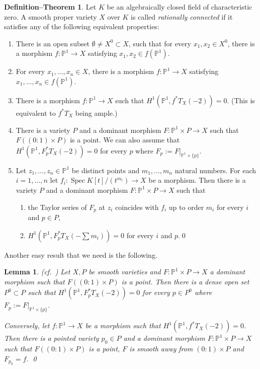 \documentclass[12pt,twoside]{amsart}
\newcommand{\p}[0]{{\mathbb P}}
\newcommand{\spec}[0]{\operatorname{Spec}}
\newtheorem{lem}[thm]{Lemma}
\theoremstyle{definition}
\newtheorem{defn-thm}[thm]{Definition--Theorem}
\theoremstyle{remark}
\begin{document}
\begin{defn-thm}
 \label{rc.equiv.def}
Let $ K$ be an  algebraically closed field of characteristic zero.
 A smooth proper variety $X$ over $ K$
is called {\em rationally connected} if it satisfies any of the
following 
equivalent properties:
\begin{enumerate}
\item There is an open subset $\emptyset\neq X^0\subset X$,
such that for every
$x_1,x_2\in X^0$, there is a morphism $f:\p^1\to X$ satisfying
$x_1,x_2\in f(\p^1)$.

\item For every
$x_1,\dots,x_n\in X$, there is a morphism $f:\p^1\to X$
satisfying
$x_1,\dots,x_n\in f(\p^1)$.

\item There is a morphism $f:\p^1\to X$ such that 
$H^1(\p^1,f^*T_X(-2))=0$. (This is equivalent to $f^*T_X$ being 
ample.) 
 
 
\item There is a variety $P$ and a dominant morphism
$F:\p^1\times P\to X$ such that $F((0{\colon\!}1)\times P)$ is a point.
We can also assume that $H^1(\p^1,F_p^*T_X(-2))=0$ for every $p$ where
$F_p:=F|_{\p^1\times\{p\}}$.


\item  Let $z_1,\dots,z_n\in\p^1$ be distinct points
and $m_1,\dots,m_n$ natural numbers. For
each $i=1,\dots,n$ let
$f_i:\spec  K[t]/(t^{m_i})\to X$ be a morphism.  
 Then there is a variety $P$ and a dominant morphism
$F:\p^1\times P\to X$
 such that 
 \begin{enumerate}
 \item the Taylor series of $F_p$ at $z_i$ coincides
with $f_i$ 
up to order $m_i$ for every $i$ and $p\in P$,
\item $H^1(\p^1,F_p^*T_X(-\sum m_i))=0$ for every $i$ and $p$.\qed
\end{enumerate}
\end{enumerate}
\end{defn-thm}

Another easy result that we need is the following.

\begin{lem}(cf.\ \cite[II.3.5.4,II.3.10.1 and II.3.11]{rcbook})
\label{free.maps.lem}
Let $X, P$ be  smooth varieties and 
$F:\p^1\times P\to X$ a dominant morphism
 such that $F((0{\colon\!} 1)\times P)$ is a point.
 Then there is a dense open set $P^0\subset P$ such that 
 $H^1(\p^1,F_p^*T_X(-2))=0$ for every $p\in P^0$ where
$F_p:=F|_{\p^1\times\{p\}}$.

Conversely, let $f:\p^1\to X$ be a morphism such that 
$H^1(\p^1,f^*T_X(-2))=0$. Then there is a pointed variety $p_0\in P$
and a dominant morphism $F:\p^1\times P\to X$ 
such that $F((0{\colon\!} 1)\times P)$ is a point,
$F$ is smooth away from $(0{\colon\!} 1)\times P$ 
and $F_{p_0}=f$.
\qed
\end{lem} 
\end{document}
